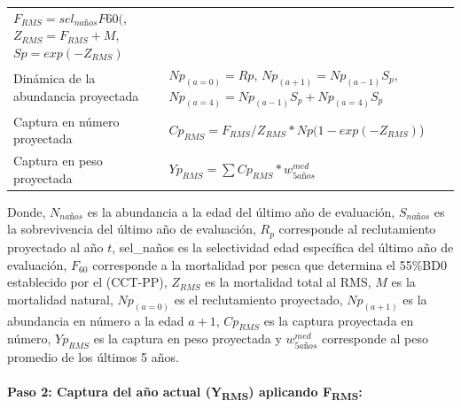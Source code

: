 \documentclass[
  spanish,
]{article}
\begin{document}
\begin{longtable}[]{@{}ll@{}}
\begin{minipage}[t]{0.37\columnwidth}
\(F_{RMS}=sel_{naños} F60(%
\), \(Z_{RMS}=F_{RMS}+M\), \(Sp=exp(-Z_{RMS} )\)\strut
\end{minipage}\tabularnewline
\begin{minipage}[t]{0.57\columnwidth}\raggedright
Dinámica de la abundancia proyectada\strut
\end{minipage} & \begin{minipage}[t]{0.37\columnwidth}\raggedright
\(Np_(a=0)=Rp\), \(Np_{(a+1)}=Np_{(a-1)} S_p\),
\(Np_{(a=4)}=Np_{(a-1)} S_p+Np_{(a=4)} S_p\)\strut
\end{minipage}\tabularnewline
\begin{minipage}[t]{0.57\columnwidth}\raggedright
Captura en número proyectada\strut
\end{minipage} & \begin{minipage}[t]{0.37\columnwidth}\raggedright
\(Cp_{RMS}=F_{RMS}/Z_{RMS}*Np(1-exp(-Z_{RMS})\))\strut
\end{minipage}\tabularnewline
\begin{minipage}[t]{0.57\columnwidth}\raggedright
Captura en peso proyectada\strut
\end{minipage} & \begin{minipage}[t]{0.37\columnwidth}\raggedright
\(Yp_{RMS}=\sum{Cp_{RMS}* w_{5años}^{med}}\)\strut
\end{minipage}\tabularnewline
\bottomrule
\end{longtable}

\normalsize

Donde, \(N_{naños}\) es la abundancia a la edad del último año de
evaluación, \(S_{naños}\) es la sobrevivencia del último año de
evaluación, \(R_p\) corresponde al reclutamiento proyectado al año
\(t\), sel\_naños es la selectividad edad específica del último año de
evaluación, \(F_{60}\) corresponde a la mortalidad por pesca que
determina el 55\%BD0 establecido por el (CCT-PP), \(Z_{RMS}\) es la
mortalidad total al RMS, \(M\) es la mortalidad natural, \(Np_{(a=0)}\)
es el reclutamiento proyectado, \(Np_{(a+1)}\) es la abundancia en
número a la edad \(a+1\), \(Cp_{RMS}\) es la captura proyectada en
número, \(Yp_{RMS}\) es la captura en peso proyectada y
\(w_{5años}^{med}\) corresponde al peso promedio de los últimos 5 años.

\hypertarget{paso-2-captura-del-auxf1o-actual-yrms-aplicando-frms}{%
\paragraph{\texorpdfstring{Paso 2: Captura del año actual
(Y\textsubscript{RMS}) aplicando
F\textsubscript{RMS}:}{Paso 2: Captura del año actual (YRMS) aplicando FRMS:}}\label{paso-2-captura-del-auxf1o-actual-yrms-aplicando-frms}}
\end{document}
